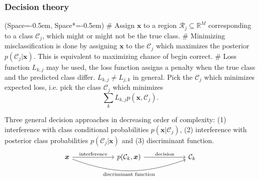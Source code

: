 \documentclass[12pt, a4paper]{article}
\newcommand{\listSpace}{-0.5em}%
\newcommand{\R}{\mathbb{R}}
\newcommand{\Reg}{\mathcal{R}}
\newcommand{\Class}{\mathcal{C}}
\newcommand{\vect}[1]{\bm{#1}}
\begin{document}
\subsubsection*{Decision theory}
\begin{easylist}[itemize]
	\ListProperties(Space=\listSpace, Space*=\listSpace)
	# Assign $\vect{x}$ to a region $\Reg_j \subseteq \R^M$ corresponding to a class $\Class_j$, which might or might not be the true class.
	# Minimizing misclassification is done by assigning $\vect{x}$ to the $\Class_j$ which maximizes the posterior $p(\Class_j | \vect{x})$.
	This is equivalent to maximizing chance of begin correct.
	# Loss function $L_{k,j}$ may be used, the loss function assigns a penalty when the true class and the predicted class differ. 
	$L_{k,j} \neq L_{j,k}$ in general.
	Pick the $\Class_j$ which minimizes expected loss, i.e. pick the class $\Class_j$ which minimizes
	\begin{equation*}
	\sum_k L_{k, j} p( \vect{x}, \Class_j).
	\end{equation*}
\end{easylist}
Three general decision approaches in decreasing order of complexity:
(1) interference with class conditional probabilities $p(\vect{x} | \Class_j)$,
(2) interference with posterior class probabilities $p(\Class_j | \vect{x})$ and
(3) discriminant function.
\[\begin{tikzcd}[column sep=6em]
\vect{x} \arrow[]{r}{\text{interference}} 
\arrow[swap, bend right = 20]{rr}{\text{discriminant function}} 
& p(\Class_k , \vect{x}) \arrow[]{r}{\text{decision}} & \Class_k
\end{tikzcd}\]
\end{document}
